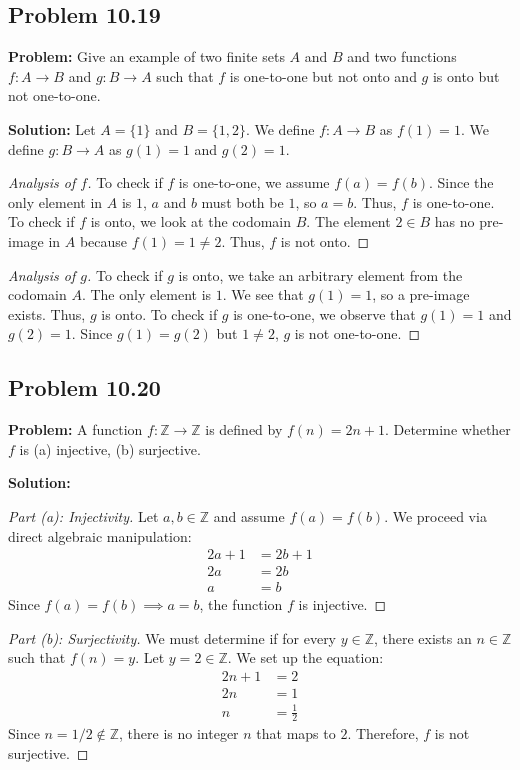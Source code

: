\documentclass[11pt, a4paper]{article}
\theoremstyle{definition}
\theoremstyle{remark}
\newcommand{\Z}{\mathbb{Z}}
\begin{document}
\subsection{Problem 10.19}
\textbf{Problem:} Give an example of two finite sets $A$ and $B$ and two functions $f : A \to B$ and $g : B \to A$ such that $f$ is one-to-one but not onto and $g$ is onto but not one-to-one.

\textbf{Solution:}
Let $A = \{1\}$ and $B = \{1, 2\}$. 
We define $f: A \to B$ as $f(1) = 1$.
We define $g: B \to A$ as $g(1) = 1$ and $g(2) = 1$.

\begin{proof}[Analysis of $f$]
To check if $f$ is one-to-one, we assume $f(a) = f(b)$. Since the only element in $A$ is $1$, $a$ and $b$ must both be $1$, so $a = b$. Thus, $f$ is one-to-one. To check if $f$ is onto, we look at the codomain $B$. The element $2 \in B$ has no pre-image in $A$ because $f(1) = 1 \neq 2$. Thus, $f$ is not onto.
\end{proof}
\begin{proof}[Analysis of $g$]
To check if $g$ is onto, we take an arbitrary element from the codomain $A$. The only element is $1$. We see that $g(1) = 1$, so a pre-image exists. Thus, $g$ is onto. To check if $g$ is one-to-one, we observe that $g(1) = 1$ and $g(2) = 1$. Since $g(1) = g(2)$ but $1 \neq 2$, $g$ is not one-to-one.
\end{proof}

\subsection{Problem 10.20}
\textbf{Problem:} A function $f : \Z \to \Z$ is defined by $f(n) = 2n + 1$. Determine whether $f$ is (a) injective, (b) surjective.

\textbf{Solution:}
\begin{proof}[Part (a): Injectivity]
Let $a, b \in \Z$ and assume $f(a) = f(b)$. We proceed via direct algebraic manipulation:
\begin{align*}
2a + 1 &= 2b + 1 \\
2a &= 2b \\
a &= b
\end{align*}
Since $f(a) = f(b) \implies a = b$, the function $f$ is injective.
\end{proof}
\begin{proof}[Part (b): Surjectivity]
We must determine if for every $y \in \Z$, there exists an $n \in \Z$ such that $f(n) = y$. Let $y = 2 \in \Z$. We set up the equation:
\begin{align*}
2n + 1 &= 2 \\
2n &= 1 \\
n &= \frac{1}{2}
\end{align*}
Since $n = 1/2 \notin \Z$, there is no integer $n$ that maps to $2$. Therefore, $f$ is not surjective.
\end{proof}
\end{document}
